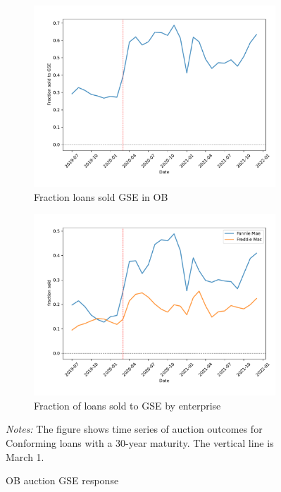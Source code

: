 \documentclass[11pt,a4paper]{article}
\begin{document}
\begin{figure}[h]
  \centering
  \begin{subfigure}[b]{0.49\textwidth}
      \includegraphics[width=0.998\textwidth]{../results/figures/sold_GSE_mean_mat30_loan1_timeseries_nrmonthly_2.5_4_.pdf}
      \caption{Fraction loans sold GSE in OB }
     \end{subfigure}
     \begin{subfigure}[b]{0.49\textwidth}
      \includegraphics[width=0.998\textwidth]{../results/figures/sold_FreddieBid_mean_mat30_loan1_timeseries_nrmonthly_2.5_4_.pdf}
      \caption{ Fraction of loans sold to GSE by enterprise }\label{fig:gse_loans}
     \end{subfigure}
     \caption{OB auction  GSE response } 
   \begin{minipage}{\textwidth}
      \footnotesize{\textit{Notes:} The figure shows time series of auction outcomes for Conforming loans with a 30-year maturity. The vertical line is March 1.  } 
      \end{minipage}
\end{figure}
\end{document}
